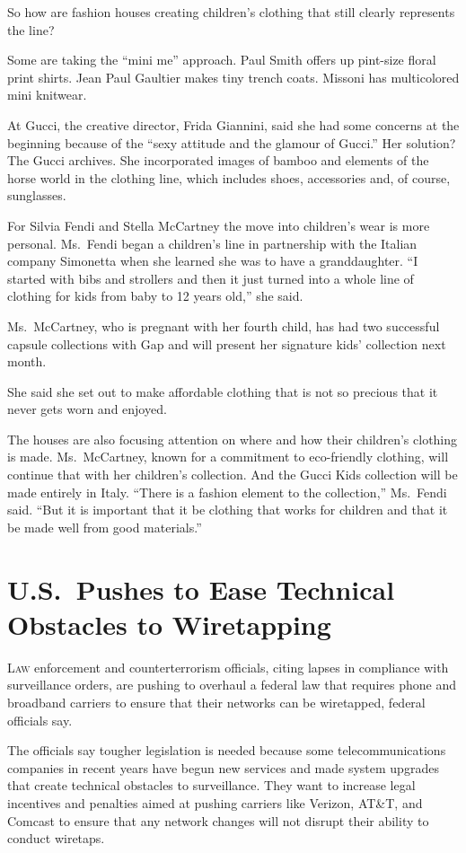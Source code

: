 ﻿\documentclass[12pt]{article}
\begin{document}
So how are fashion houses creating children's clothing that still clearly represents the line?

Some are taking the ``mini me'' approach. Paul Smith offers up pint-size floral print shirts. Jean
Paul Gaultier makes tiny trench coats. Missoni has multicolored mini knitwear.

At Gucci, the creative director, Frida Giannini, said she had some concerns at the beginning because
of the ``sexy attitude and the glamour of Gucci.'' Her solution? The Gucci archives. She
incorporated images of bamboo and elements of the horse world in the clothing line, which includes
shoes, accessories and, of course, sunglasses.

For Silvia Fendi and Stella McCartney the move into children's wear is more personal. Ms.~Fendi
began a children's line in partnership with the Italian company Simonetta when she learned she was
to have a granddaughter. ``I started with bibs and strollers and then it just turned into a whole
line of clothing for kids from baby to 12 years old,'' she said.

Ms.~McCartney, who is pregnant with her fourth child, has had two successful capsule collections
with Gap and will present her signature kids' collection next month.

She said she set out to make affordable clothing that is not so precious that it never gets worn and
enjoyed.

The houses are also focusing attention on where and how their children's clothing is made.
Ms.~McCartney, known for a commitment to eco-friendly clothing, will continue that with her
children's collection. And the Gucci Kids collection will be made entirely in Italy. ``There is a
fashion element to the collection,'' Ms.~Fendi said. ``But it is important that it be clothing that
works for children and that it be made well from good materials.''

\section{U.S.~Pushes to Ease Technical Obstacles to Wiretapping}

\lettrine{L}{aw} enforcement and counterterrorism officials, citing lapses
in compliance with surveillance orders, are pushing to overhaul a federal law that requires phone
and broadband carriers to ensure that their networks can be wiretapped, federal officials say.

The officials say tougher legislation is needed because some telecommunications companies in recent
years have begun new services and made system upgrades that create technical obstacles to
surveillance. They want to increase legal incentives and penalties aimed at pushing carriers like
Verizon, AT\&T, and Comcast to ensure that any network changes will not disrupt their ability to
conduct wiretaps.
\end{document}
